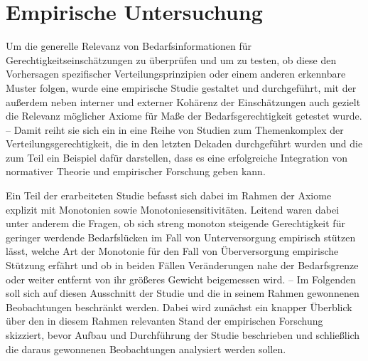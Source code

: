 \documentclass[a4paper]{thesis}
\begin{document}
\section{Empirische Untersuchung}
\lettrine{U}{}\thickspace m die generelle Relevanz von Bedarfsinformationen für Gerechtigkeitseinschätzungen zu überprüfen und um zu testen, ob diese den Vorhersagen spezifischer Verteilungsprinzipien oder einem anderen erkennbare Muster folgen, wurde eine empirische Studie gestaltet und durchgeführt, mit der außerdem neben interner und externer Kohärenz der Einschätzungen auch gezielt die Relevanz möglicher Axiome für Maße der Bedarfsgerechtigkeit getestet wurde. -- Damit reiht sie sich ein in eine Reihe von Studien zum Themenkomplex der Verteilungsgerechtigkeit, die in den letzten Dekaden durchgeführt wurden und die zum Teil ein Beispiel dafür darstellen, dass es eine erfolgreiche Integration von normativer Theorie und empirischer Forschung geben kann.

Ein Teil der erarbeiteten Studie befasst sich dabei im Rahmen der Axiome explizit mit Monotonien sowie Monotoniesensitivitäten. Leitend waren dabei unter anderem die Fragen, ob sich streng monoton steigende Gerechtigkeit für geringer werdende Bedarfslücken im Fall von Unterversorgung empirisch stützen lässt, welche Art der Monotonie für den Fall von Überversorgung empirische Stützung erfährt und ob in beiden Fällen Veränderungen nahe der Bedarfsgrenze oder weiter entfernt von ihr größeres Gewicht beigemessen wird. -- Im Folgenden soll sich auf diesen Ausschnitt der Studie und die in seinem Rahmen gewonnenen Beobachtungen beschränkt werden. Dabei wird zunächst ein knapper Überblick über den in diesem Rahmen relevanten Stand der empirischen Forschung skizziert, bevor Aufbau und Durchführung der Studie beschrieben und schließlich die daraus gewonnenen Beobachtungen analysiert werden sollen.
\end{document}
